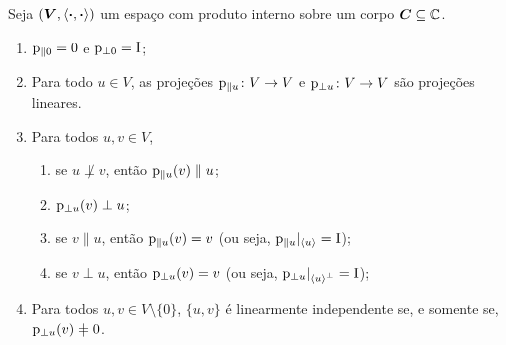 \begin{proposition}
Seja $(\bm V,\left\langle{\bm{\cdot}},{\bm{\cdot}}\right\rangle)$ um espaço com produto interno sobre um corpo $\bm C \subseteq \mathbb{C}$.
	\begin{enumerate}
	\item $\mathrm{p}_{\parallel 0} = 0$ e $\mathrm{p}_{\perp 0} = \mathrm{I}$;
	\item Para todo $u \in V$, as projeções $\mathrm{p}_{\parallel u}\colon V \to V$ e $\mathrm{p}_{\perp u}\colon V \to V$ são projeções lineares.
	\item Para todos $u, v \in V$,
		\begin{enumerate}
		\item se $u \not\perp v$, então $\mathrm{p}_{\parallel u}(v) \parallel u$;
		\item $\mathrm{p}_{\perp u}(v) \perp u$;
		\item se $v \parallel u$, então $\mathrm{p}_{\parallel u}(v) = v$ (ou seja, $\mathrm{p}_{\parallel u}|_{\left\langle u \right\rangle} = \mathrm{I}$);
		\item se $v \perp u$, então $\mathrm{p}_{\perp u}(v) = v$ (ou seja, $\mathrm{p}_{\perp u}|_{\left\langle u \right\rangle^\perp} = \mathrm{I}$);
		\end{enumerate}
	\item Para todos $u,v \in V \setminus \{0\}$, $\{u,v\}$ é linearmente independente se, e somente se, $\proj_{\perp u}(v) \neq 0$.
	\end{enumerate}
\end{proposition}
